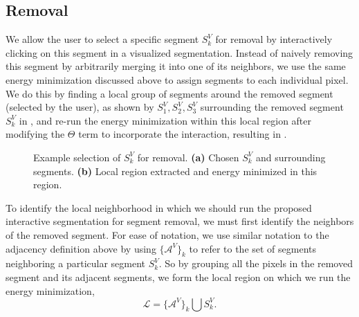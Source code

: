\documentclass[]{spie}  %
\begin{document}
\subsection{Removal}
\label{sec:remove}

We allow the user to select a specific segment $S^V_k$ for removal by
interactively clicking on this segment in a visualized segmentation.
Instead of naively removing this segment by arbitrarily merging it
into one of its neighbors, we use the same energy minimization
discussed above to assign segments to each individual pixel.  We do
this by finding a local group of segments around the removed segment
(selected by the user), as shown by $S^V_1, S^V_2, S^V_3$ surrounding
the removed segment $S^V_k$ in , and re-run the
energy minimization within this local region after modifying the
$\Theta$ term to incorporate the interaction, resulting in
.
\begin{figure}[htbp]
\centering
{}
\hspace{0.1em}
\caption{Example selection of $S^V_k$ for removal.  \textbf{(a)}
  Chosen $S^V_k$ and surrounding segments.  \textbf{(b)} Local region
  extracted and energy minimized in this
  region.} \label{fig:removal-ex}
\end{figure}

To identify the local neighborhood in which we should run the proposed
interactive segmentation for segment removal, we must first identify
the neighbors of the removed segment.  For ease of notation, we use
similar notation to the adjacency definition above by using
$\{\mathcal{A}^V\}_k$ to refer to the set of segments neighboring a
particular segment $S^V_k$.  So by grouping all the pixels in the
removed segment and its adjacent segments, we form the local region on
which we run the energy minimization,
\begin{equation}
  \mathcal{L} = \{\mathcal{A}^V\}_k \bigcup S^V_k .
\end{equation}
\end{document}
